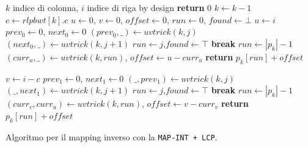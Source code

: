 \begin{algorithm}
  \begin{algorithmic}[1]
    \Comment $k$ indice di colonna, $i$ indice di riga
    \Comment by design
    \State \textbf{return} $0$
    \EndIf
    \State $k\gets k-1$
    \State $c\gets rlpbwt[k].c$
    \State $u\gets 0$, $v\gets 0$, $offset\gets 0$, $run \gets 0$,
    $found\gets \bot$
    \State $u\gets i$
    \State $prev_0\gets 0$, $next_0\gets 0$
    \For {\textit{every} $j\in [0,|p_k|)$}
    \State $(prev_0,\_) \gets uvtrick(k,j)$
    \State $(next_0,\_) \gets uvtrick(k,j+1)$
    \State $run\gets j$,$found\gets \top$
    \State \textbf{break}
    \EndIf
    \EndFor
    \State $run \gets |p_k|-1$
    \EndIf
    \State $(curr_u,\_)\gets uvtrick(k, run)$, $offset\gets u-curr_u$
    \State \textbf{return} $p_k[run]+offset$
    \Else

    \State $v\gets i-c$
    \State $prev_1\gets 0$, $next_1\gets 0$
    \For {\textit{every} $j\in [0,|p_k|)$}
    \State $(\_,prev_1) \gets uvtrick(k,j)$
    \State $(\_,next_1) \gets uvtrick(k,j+1)$
    \State $run\gets j$,$found\gets \top$
    \State \textbf{break}
    \EndIf
    \EndFor
    \State $run \gets |p_k|-1$
    \EndIf
    \State $(curr_v,curr_u)\gets uvtrick(k, run)$, $offset\gets v-curr_v$
    \State \textbf{return} $p_k[run]+offset$
    \EndIf
    \EndFunction
  \end{algorithmic}
  \caption{Algoritmo per il mapping inverso con la \texttt{MAP-INT + LCP}.}
  \label{algo:lfrev}
\end{algorithm}

